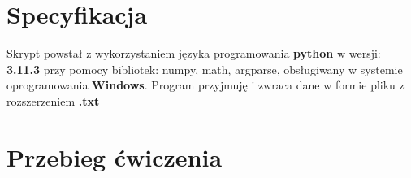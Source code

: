 \section{Specyfikacja}

\begin{flushleft}
	\hspace{1cm}Skrypt powstał z wykorzystaniem języka programowania \textbf{python} w wersji: \textbf{3.11.3} przy pomocy bibliotek: numpy, math, argparse, obsługiwany w systemie oprogramowania \textbf{Windows}. Program przyjmuję i zwraca dane w formie pliku z rozszerzeniem \textbf{.txt}
\end{flushleft}

\section{Przebieg ćwiczenia}


